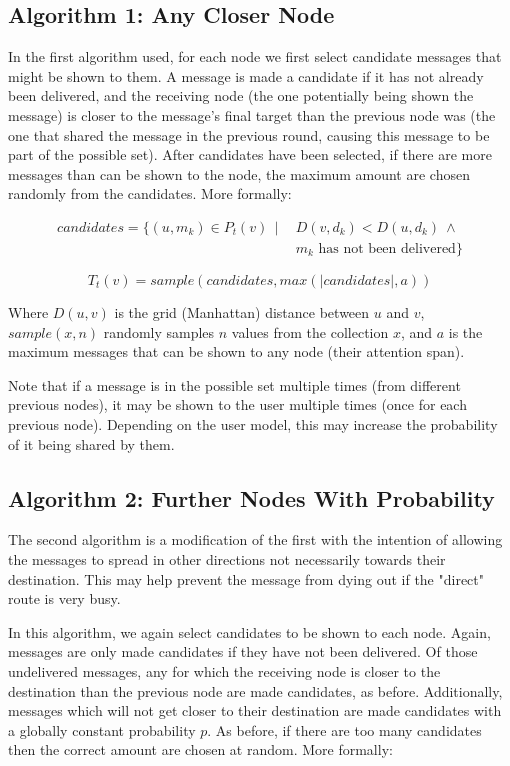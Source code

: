 \documentclass[bsc,frontabs,twoside,singlespacing,parskip,deptreport]{infthesis}     %
\begin{document}
\subsection{Algorithm 1: Any Closer Node}
In the first algorithm used, for each node we first select candidate messages that might be shown to them. A message is made a candidate if it has not already been delivered, and the receiving node (the one potentially being shown the message) is closer to the message's final target than the previous node was (the one that shared the message in the previous round, causing this message to be part of the possible set). After candidates have been selected, if there are more messages than can be shown to the node, the maximum amount are chosen randomly from the candidates. More formally:

\begin{equation}
\begin{split}
candidates = \{ (u, m_{k}) \in P_{t}(v) \:\: | \:\: & D(v, d_{k}) < D(u, d_{k}) \: \wedge \\
& m_{k} \mbox{ has not been delivered} \}
\end{split}
\end{equation}

\begin{equation}
T_{t}(v) = sample(candidates, max(|candidates|, a))
\end{equation}

Where $D(u, v)$ is the grid (Manhattan) distance between $u$ and $v$, $sample(x, n)$ randomly samples $n$ values from the collection $x$, and $a$ is the maximum messages that can be shown to any node (their attention span).

Note that if a message is in the possible set multiple times (from different previous nodes), it may be shown to the user multiple times (once for each previous node). Depending on the user model, this may increase the probability of it being shared by them.

\subsection{Algorithm 2: Further Nodes With Probability}
The second algorithm is a modification of the first with the intention of allowing the messages to spread in other directions not necessarily towards their destination. This may help prevent the message from dying out if the "direct" route is very busy.

In this algorithm, we again select candidates to be shown to each node. Again, messages are only made candidates if they have not been delivered. Of those undelivered messages, any for which the receiving node is closer to the destination than the previous node are made candidates, as before. Additionally, messages which will not get closer to their destination are made candidates with a globally constant probability $p$. As before, if there are too many candidates then the correct amount are chosen at random. More formally:
\end{document}

